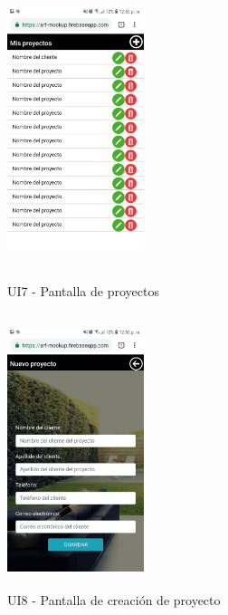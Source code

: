 \begin{figure}[h!]
	\begin{minipage}{0.48\textwidth}
		\centering
		\includegraphics[width=4cm,height=8cm]{imagenes/Anexos/Mockup/proyectos.jpg}
		\caption{UI7 - Pantalla de proyectos}
		\label{fig:proyectos}
	\end{minipage}\hfill
	\begin{minipage}{0.48\textwidth}
		\centering
		\includegraphics[width=4cm,height=8cm]{imagenes/Anexos/Mockup/nuevo_proyecto.jpg}
		\caption{UI8 - Pantalla de creación de proyecto}
		\label{fig:newproy}
	\end{minipage}\hfill
\end{figure}

